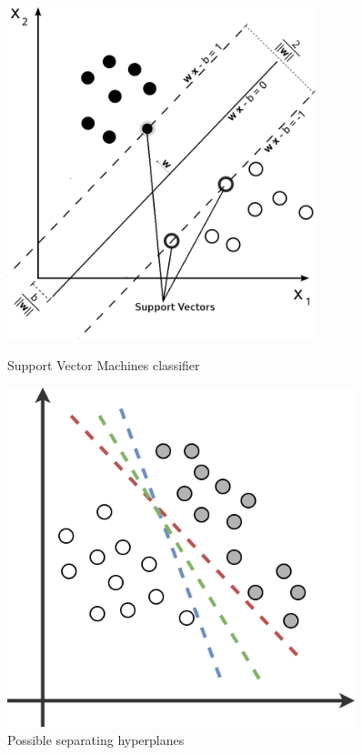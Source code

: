 \begin{figure}[!h]
	\begin{minipage}[t]{0.5\linewidth}
		\centering
		\includegraphics[width=0.8\textwidth]{img/SVMPlot2.png}
		\caption{Support Vector Machines classifier}
		\label{svmclassifier}
	\end{minipage}
	\hspace{0.1cm}
	\begin{minipage}[t]{0.5\linewidth} 
		\centering
		\includegraphics[width=0.9\textwidth]{img/separating-lines.png}
		\caption{Possible separating hyperplanes}
		\label{svmmargindecison}
	\end{minipage}        
\end{figure} 

